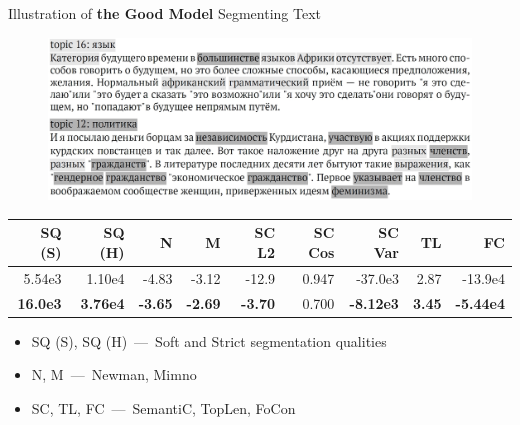 \documentclass[russian]{beamer}
\begin{document}
\begin{frame}{Illustration of \textbf{the Good Model} Segmenting Text}
  \begin{figure}[h]
    \centering
    \includegraphics[width=\textwidth]{combine_good.jpg}
  \end{figure}
    
  \vspace{-0.5cm}

  \begin{table}[h]
    \scriptsize
    \centering
    \begin{tabular}{rrrrrrrrr}
      SQ (S) & SQ (H) & N & M & SC L2 & SC Cos & SC Var & TL & FC\\
      \midrule
      5.54e3 & 1.10e4 & -4.83 & -3.12 & -12.9 & 0.947 & -37.0e3 & 2.87 & -13.9e4\\
      \rowcolor{my-pink}
      \textbf{16.0e3} & \textbf{3.76e4} & \textbf{-3.65} & \textbf{-2.69} & \textbf{-3.70} & 0.700 & \textbf{-8.12e3} & \textbf{3.45} & \textbf{-5.44e4}
    \end{tabular}
  \end{table}
  
  \begin{itemize}\setlength{\itemindent}{0pt}
    \small
    \item SQ (S), SQ (H)~---~Soft and Strict segmentation qualities
    \item N, M~---~Newman, Mimno
    \item SC, TL, FC~---~SemantiC, TopLen, FoCon
  \end{itemize}
\end{frame}
\end{document}
